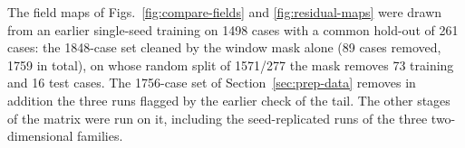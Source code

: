 The field maps of Figs.~\ref{fig:compare-fields} and \ref{fig:residual-maps} were drawn from an earlier single-seed training on 1498 cases with a common hold-out of 261 cases: the 1848-case set cleaned by the window mask alone (89 cases removed, 1759 in total), on whose random split of 1571/277 the mask removes 73 training and 16 test cases. %
The 1756-case set of Section~\ref{sec:prep-data} removes in addition the three runs flagged by the earlier check of the tail. The other stages of the matrix were run on it, including the seed-replicated runs of the three two-dimensional families. %

